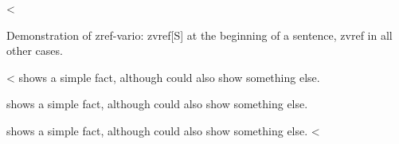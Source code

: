 <%
\label{sec:ex:vref}

Demonstration of zref-vario: zvref[S] at the beginning of a sentence, zvref in all other cases.

<%
 shows a simple fact, although  could also show something else.

 shows a simple fact, although  could also show something else.

 shows a simple fact, although  could also show something else.
<%
